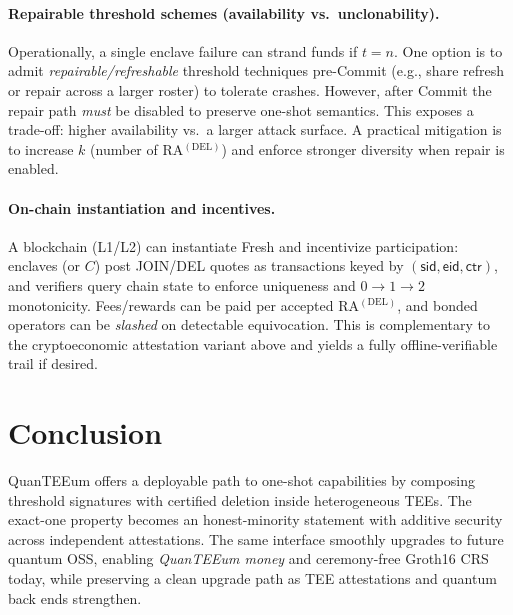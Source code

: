 \documentclass[runningheads,orivec]{llncs}
\newcommand{\prot}{\textsf{QuanTEEum}}
\newcommand{\sid}{\mathsf{sid}}
\begin{document}
\paragraph{Repairable threshold schemes (availability vs.\ unclonability).}
Operationally, a single enclave failure can strand funds if $t\!=\!n$. One option is to admit \emph{repairable/refreshable} threshold techniques pre\mbox{-}Commit (e.g., share refresh or repair across a larger roster) to tolerate crashes. However, after Commit the repair path \emph{must} be disabled to preserve one\mbox{-}shot semantics. This exposes a trade-off: higher availability vs.\ a larger attack surface. A practical mitigation is to increase $k$ (number of RA$^{(\mathrm{DEL})}$) and enforce stronger diversity when repair is enabled.

\paragraph{On-chain instantiation and incentives.}
A blockchain (L1/L2) can instantiate \textsf{Fresh} and incentivize participation: enclaves (or $C$) post JOIN/DEL quotes as transactions keyed by $(\sid,\mathsf{eid},\mathsf{ctr})$, and verifiers query chain state to enforce uniqueness and $0\!\rightarrow\!1\!\rightarrow\!2$ monotonicity. Fees/rewards can be paid per accepted RA$^{(\mathrm{DEL})}$, and bonded operators can be \emph{slashed} on detectable equivocation. This is complementary to the cryptoeconomic attestation variant above and yields a fully offline-verifiable trail if desired.

\section{Conclusion}
\prot{} offers a deployable path to one-shot capabilities by composing threshold signatures with certified deletion inside heterogeneous TEEs. The exact-one property becomes an honest-minority statement with additive security across independent attestations. The same interface smoothly upgrades to future quantum OSS, enabling \emph{QuanTEEum money} and ceremony-free Groth16 CRS today, while preserving a clean upgrade path as TEE attestations and quantum back ends strengthen.



\end{document}
